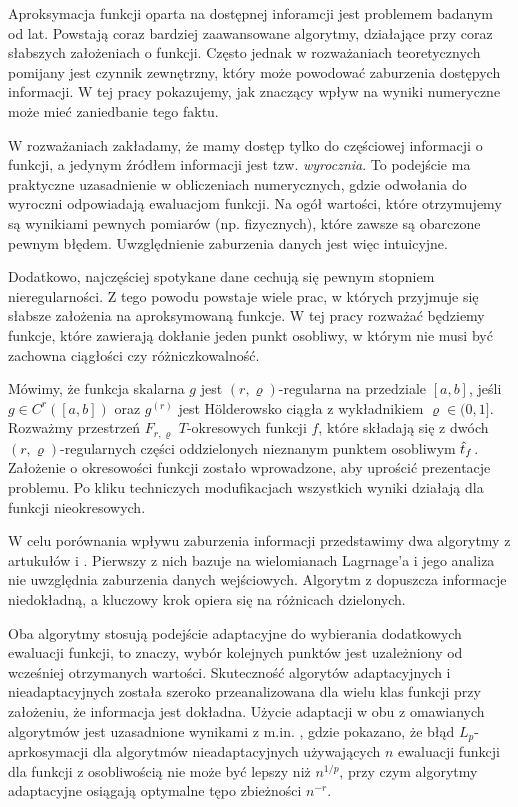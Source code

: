 \documentclass[oik, pdftex, robocza, man]{mgrwms}
\begin{document}
\begin{wstep}[Wprowadzenie]
    Aproksymacja funkcji oparta na dostępnej inforamcji jest problemem badanym od lat. Powstają coraz bardziej zaawansowane algorytmy, działające przy coraz słabszych założeniach o funkcji. Często jednak w rozważaniach teoretycznych pomijany jest czynnik zewnętrzny, który może powodować zaburzenia dostępych informacji. W tej pracy pokazujemy, jak znaczący wpływ na wyniki numeryczne może mieć zaniedbanie tego faktu.

    W rozważaniach zakładamy, że mamy dostęp tylko do częściowej informacji o funkcji, a jedynym źródłem informacji jest tzw. \textit{wyrocznia}. To podejście ma praktyczne uzasadnienie w obliczeniach numerycznych, gdzie odwołania do wyroczni odpowiadają ewaluacjom funkcji. Na ogół wartości, które otrzymujemy są wynikiami pewnych pomiarów (np. fizycznych), które zawsze są obarczone pewnym błędem. Uwzględnienie zaburzenia danych jest więc intuicyjne.
    
    Dodatkowo, najczęściej spotykane dane cechują się pewnym stopniem nieregularności. Z tego powodu powstaje wiele prac, w których przyjmuje się słabsze założenia na aproksymowaną funkcje. W tej pracy rozważać będziemy funkcje, które zawierają dokłanie jeden punkt osobliwy, w którym nie musi być zachowna ciągłości czy różniczkowalność.

    Mówimy, że funkcja skalarna $g$ jest $(r, \varrho)$-regularna na przedziale $[a,b]$, jeśli $g \in C^{r}([a,b])$ oraz $g^{(r)}$ jest Hölderowsko ciągła z wykładnikiem $\varrho \in (0,1]$. Rozważmy przestrzeń $F_{r,\varrho}$ $T$-okresowych funkcji $f$, które składają się z dwóch $(r,\varrho)$-regularnych części oddzielonych nieznanym punktem osobliwym $\hat{t}_{f}$. Założenie o okresowości funkcji zostało wprowadzone, aby uprościć prezentacje problemu. Po kliku techniczych modufikacjach wszystkich wyniki działają dla funkcji nieokresowych.

    W celu porównania wpływu zaburzenia informacji przedstawimy dwa algorytmy z artukułów \cite{AoP} i \cite{CoDF}. Pierwszy z nich bazuje na wielomianach Lagrnage'a i jego analiza nie uwzględnia zaburzenia danych wejściowych. Algorytm z \cite{AoP} dopuszcza informacje niedokładną, a kluczowy krok opiera się na różnicach dzielonych. 

    Oba algorytmy stosują podejście adaptacyjne do wybierania dodatkowych ewaluacji funkcji, to znaczy, wybór kolejnych punktów jest uzależniony od wcześniej otrzymanych wartości. Skuteczność algorytów adaptacyjnych i nieadaptacyjnych została szeroko przeanalizowana dla wielu klas funkcji przy założeniu, że informacja jest dokładna. Użycie adaptacji w obu z omawianych algorytmów jest uzasadnione wynikami z m.in. \cite{PoA}, gdzie pokazano, że błąd $L_{p}$-aprkosymacji dla algorytmów nieadaptacyjnych używających $n$ ewaluacji funkcji dla funkcji z osobliwością nie może być lepszy niż $n^{1/p}$, przy czym algorytmy adaptacyjne osiągają optymalne tępo zbieżności $n^{-r}$.
    

\end{wstep}
\end{document}
